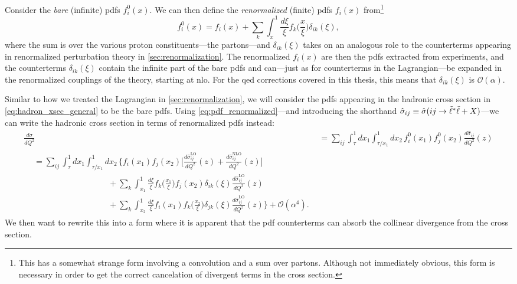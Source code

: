Consider the \emph{bare} (infinite) \glspl{pdf} $f_i^0(x)$. We can then define the \emph{renormalized} (finite) \glspl{pdf} $f_i(x)$ from\footnote{This has a somewhat strange form involving a convolution and a sum over partons. Although not immediately obvious, this form is necessary in order to get the correct cancelation of divergent terms in the cross section.}
\begin{equation}\label{eq:pdf_renormalized}
    f_i^0(x) = f_i(x) + \sum_k \int_x^1 \frac{d\xi}{\xi} f_k\biggl(\frac{x}{\xi}\biggr) \delta_{ik}(\xi),
\end{equation}
where the sum is over the various proton constituents---the partons---and $\delta_{ik}(\xi)$ takes on an analogous role to the counterterms appearing in renormalized perturbation theory in \cref{sec:renormalization}.
The renormalized $f_i(x)$ are then the \glspl{pdf} extracted from experiments, and the counterterms $\delta_{ik}(\xi)$ contain the infinite part of the bare \glspl{pdf} and can---just as for counterterms in the Lagrangian---be expanded in the renormalized couplings of the theory, starting at \gls{nlo}.
For the \gls{qed} corrections covered in this thesis, this means that $\delta_{ik}(\xi)$ is $\mathcal{O}(\alpha)$.


Similar to how we treated the Lagrangian in \cref{sec:renormalization}, we will consider the \glspl{pdf} appearing in the hadronic cross section in \cref{eq:hadron_xsec_general} to be the bare \glspl{pdf}.
Using \cref{eq:pdf_renormalized}---and introducing the shorthand $\hat\sigma_{ij}\equiv\hat\sigma(ij\to{\tilde{\ell}}^*{\tilde{\ell}}+X)$---we can write the hadronic cross section in terms of renormalized \glspl{pdf} instead:
\begin{align}
    \frac{d\sigma}{dQ^2} &= \sum_{ij} \int_\tau^1 dx_1 \int_{\tau/x_1}^1 dx_2 \, f_i^0(x_1) f_j^0(x_2) \frac{d\hat\sigma_{ij}}{dQ^2}(z)
    \nonumber \\
    \begin{split}
        &= \sum_{ij} \int_\tau^1 dx_1 \int_{\tau/x_1}^1 dx_2 \, \Biggl\{
            f_i(x_1)f_j(x_2) \Biggl[
                \frac{d\hat\sigma_{ij}^{\mathrm{LO}}}{dQ^2}(z)
                + \frac{d\hat\sigma_{ij}^{\mathrm{NLO}}}{dQ^2}(z)
            \Biggr]
            \\ &\hspace{9em}
            + \sum_k\int_{x_1}^1\frac{d\xi}{\xi} f_k\biggl(\frac{x_1}{\xi}\biggr) f_j(x_2) \delta_{ik}(\xi) \frac{d\hat\sigma_{ij}^{\mathrm{LO}}}{dQ^2}(z)
            \\ &\hspace{9em}
            + \sum_k\int_{x_2}^1\frac{d\xi}{\xi} f_i(x_1) f_k\biggl(\frac{x_2}{\xi}\biggr) \delta_{jk}(\xi) \frac{d\hat\sigma_{ij}^{\mathrm{LO}}}{dQ^2}(z)
        \Biggr\} + \mathcal{O}(\alpha^4).
    \label{eq:hadron_xsec_renormalized}
    \end{split}
\end{align}
We then want to rewrite this into a form where it is apparent that the \gls{pdf} counterterms can absorb the collinear divergence from the cross section.

